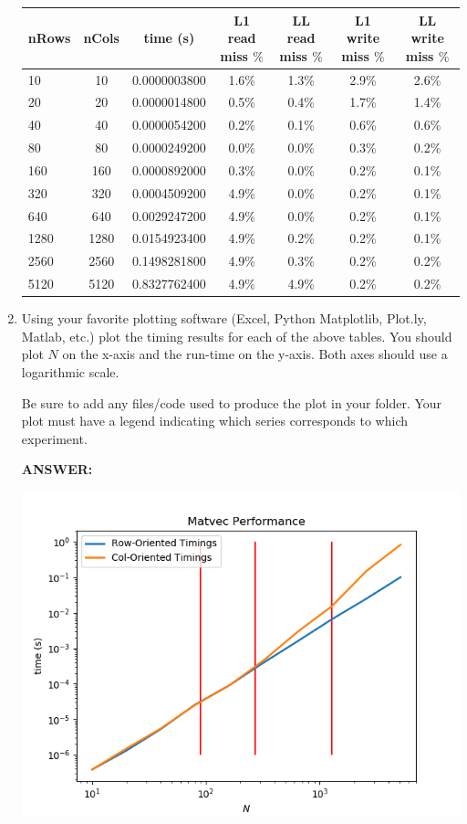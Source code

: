\documentclass[letter]{article}
\newcommand{\mypath}[1]{\texttt{\path{#1}}}
\begin{document}
\begin{enumerate}
        \begin{center}
        \begin{tabular}{|l | c | c | c  | c | c | c |} 
        \hline
        \textbf{nRows} & \textbf{nCols} & \textbf{time (s)} & L1 read miss $\%$ & LL read miss $\%$ &  L1 write miss $\%$ & LL write miss $\%$\\ \hline
        10    & 10    & 0.0000003800 & 1.6\% & 1.3\% & 2.9\% & 2.6\% \\
        20    & 20    & 0.0000014800 & 0.5\% & 0.4\% & 1.7\% & 1.4\% \\
        40    & 40    & 0.0000054200 & 0.2\% & 0.1\% & 0.6\% & 0.6\% \\
        80    & 80    & 0.0000249200 & 0.0\% & 0.0\% & 0.3\% & 0.2\% \\
        160   & 160   & 0.0000892000 & 0.3\% & 0.0\% & 0.2\% & 0.1\% \\
        320   & 320   & 0.0004509200 & 4.9\% & 0.0\% & 0.2\% & 0.1\% \\
        640   & 640   & 0.0029247200 & 4.9\% & 0.0\% & 0.2\% & 0.1\% \\
        1280  & 1280  & 0.0154923400 & 4.9\% & 0.2\% & 0.2\% & 0.1\% \\ 
        2560  & 2560  & 0.1498281800 & 4.9\% & 0.3\% & 0.2\% & 0.2\% \\
        5120  & 5120  & 0.8327762400 & 4.9\% & 4.9\% & 0.2\% & 0.2\% \\\hline
        \end{tabular}
        \end{center}
        
        
        \item Using your favorite plotting software (Excel, Python Matplotlib, Plot.ly, Matlab, etc.) plot the timing results for each of the above tables.  You should plot $N$ on the x-axis and the run-time on the y-axis.  Both axes should use a logarithmic scale.

        Be sure to add any files/code used to produce the plot in your \mypath{lab05/report} folder.  Your plot must have a legend indicating which series corresponds to which experiment.  
        
        \textbf{ANSWER:} %
        
        \includegraphics{timing.png}


\end{enumerate}
\end{document}
